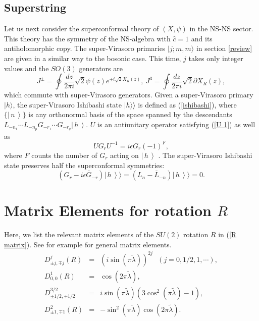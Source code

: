 \documentclass[a4paper,12pt]{article} \textheight=8.5truein
\newcommand{\ket}[1]{\left|\, #1\,\right\rangle}
\newcommand{\tlambda}{\tilde{\lambda}}
\begin{document}
\subsection{Superstring}
Let us next consider the superconformal theory of $(X,\psi)$ in
the NS-NS sector.  This theory has the symmetry of the NS-algebra
with $\hat{c}=1$ and its antiholomorphic copy. The super-Virasoro
primaries $|j;m,m\rangle$ in section \ref{review} are given in a
similar way to the bosonic case.  This time, $j$ takes only
integer values and the $SO(3)$ generators are
\begin{equation}
    J^\pm =\oint \frac{dz}{2\pi i}\sqrt{2}\psi(z)e^{\pm
    i\sqrt{2}X_R(z)},\ J^3=\oint \frac{dz}{2\pi i} \sqrt{2}
    \partial X_R(z),
\end{equation}
which commute with super-Virasoro generators.  Given a
super-Virasoro primary $|h\rangle$, the super-Virasoro Ishibashi
state $|h\rangle\rangle$ is defined as (\ref{ishibashi}), where
$\{ \ket{n}\}$ is any orthonormal basis of the space spanned by
the descendants $L_{-n_1}\cdots L_{-n_p} G_{-r_1}\cdots
G_{-r_q}\ket{h}$. $U$ is an antiunitary operator satisfying
(\ref{U 1}) as well as
\begin{equation}\label{U 2}
    U G_r U^{-1} = i\epsilon G_r (-1)^F,
\end{equation}
where $F$ counts the number of $G_r$ acting on $\ket{h}$
\cite{Ishibashi:1988kg}. The super-Virasoro Ishibashi state
preserves half the superconformal symmetries:
\begin{equation}\label{gluing2}
    (G_r-i\epsilon\bar{G}_{-r})\ket{h}\rangle
    =(L_n-\bar{L}_{-n})\ket{h}\rangle=0.
\end{equation}
\section{Matrix Elements for rotation $R$}\label{matrix elements}
Here, we list the relevant matrix elements of the
$SU(2)$ rotation $R$ in (\ref{R matrix}). See for example
\cite{Recknagel} for general matrix elements.
\begin{eqnarray}
D^j_{\pm j,\mp j}(R)&=&(i\sin(\pi\tilde\lambda))^{2j}~~~(j=0,1/2,1,\cdots),\\
D^1_{0,0}(R)&=&\cos(2\pi\tilde\lambda),\\
D^{3/2}_{\pm 1/2,\mp 1/2}&=&
i\sin(\pi\tilde\lambda)(3\cos^2(\pi\tilde\lambda)-1),\\
D^2_{\pm1,\mp1}(R)&=&-\sin^2(\pi\tlambda)\cos(2\pi\tlambda) .
\end{eqnarray}
\end{document}
